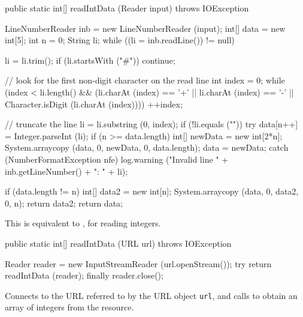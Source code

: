 \begin{code}

   public static int[] readIntData (Reader input) throws IOException\begin{hide} {
      LineNumberReader inb = new LineNumberReader (input);
      int[] data = new int[5];
      int n = 0;
      String li;
      while ((li = inb.readLine()) != null) {
        li = li.trim();
        if (li.startsWith ("#"))
           continue;

         // look for the first non-digit character on the read line
         int index = 0;
         while (index < li.length() &&
            (li.charAt (index) == '+' || li.charAt (index) == '-' ||
             Character.isDigit (li.charAt (index))))
           ++index; 

         // truncate the line
         li = li.substring (0, index);
         if (!li.equals ("")) {
            try {
               data[n++] = Integer.parseInt (li);
               if (n >= data.length) {
                  int[] newData = new int[2*n];
                  System.arraycopy (data, 0, newData, 0, data.length);
                  data = newData;
               }
            }
            catch (NumberFormatException nfe) {
               log.warning ("Invalid line " + inb.getLineNumber() + ": " + li);
            }
         }
      }
      if (data.length != n) {
         int[] data2 = new int[n];
         System.arraycopy (data, 0, data2, 0, n);
         return data2;
      }
      return data;
   }\end{hide}
\end{code}
\begin{tabb}   This is equivalent to ,
 for reading integers.
\end{tabb}
\begin{htmlonly}
\end{htmlonly}
\begin{code}

   public static int[] readIntData (URL url) throws IOException\begin{hide} {
      Reader reader = new InputStreamReader (url.openStream());
      try {
         return readIntData (reader);
      }
      finally {
         reader.close();
      }
   }\end{hide}
\end{code}
\begin{tabb}   Connects to the URL referred to by the URL object \texttt{url},
 and calls  to
 obtain an array of integers from
 the resource.
\end{tabb}
